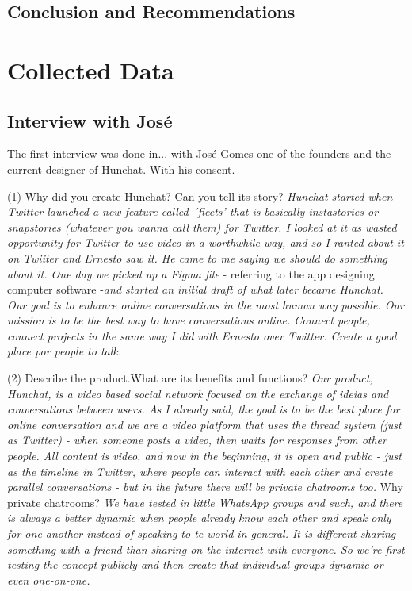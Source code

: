 \documentclass[12pt]{article}
\begin{document}
\subsection{Conclusion and Recommendations}




\cleardoublepage
\newpage	

\printbibliography
\cleardoublepage

\appendix

\section{Collected Data}\label{data}
\subsection {Interview with José} \label{ze}
The first interview was done in... with José Gomes one of the founders and the current designer of Hunchat. With his consent.

(1) Why did you create Hunchat? Can you tell its story? \textit{Hunchat started when Twitter launched a new feature called ´fleets' that is basically instastories or snapstories (whatever you wanna call them) for Twitter. I looked at it as wasted opportunity for Twitter to use video in a worthwhile way, and so I ranted about it on Twiiter and Ernesto saw it. He came to me saying we should do something about it. One day we picked up a Figma file} - referring to the app designing computer software -\textit{and started an initial draft of what later became Hunchat. Our goal is to enhance online conversations in the most human way possible. Our mission is to be the best way to have conversations online. Connect people, connect projects in the same way I did with Ernesto over Twitter. Create a good place por people to talk.} 

(2) Describe the product.What are its benefits and functions? \textit{Our product, Hunchat, is a video based social network focused on the exchange of ideias and conversations between users. As I already said, the goal is to be the best place for online conversation and we are a video platform that uses the thread system (just as Twitter) - when someone posts a video, then waits for responses from other people. All content is video, and now in the beginning, it is open and public - just as the timeline in Twitter, where people can interact with each other and create parallel conversations - but in the future there will be private chatrooms too.} Why private chatrooms? \textit{We have tested in little WhatsApp groups and such, and there is always a better dynamic when people already know each other and speak only for one another instead of speaking to te world in general. It is different sharing something with a friend than sharing on the internet with everyone. So we're first testing the concept publicly and then create that individual groups dynamic or even one-on-one.}
\end{document}
